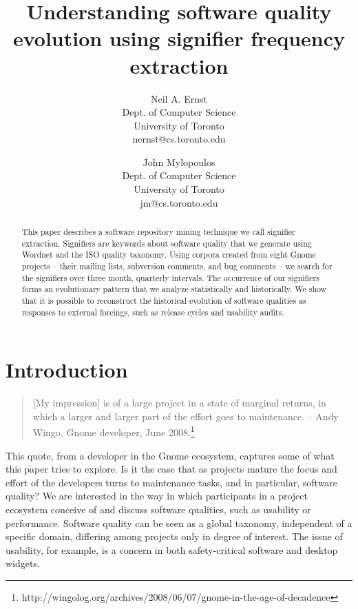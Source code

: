 \documentclass[conference, compsoc]{IEEEtran}
\begin{document}

 
\title{Understanding software quality evolution using signifier frequency extraction}
\author{
Neil A. Ernst\\Dept. of Computer Science\\University of Toronto\\nernst@cs.toronto.edu \and
John Mylopoulos\\Dept. of Computer Science\\University of Toronto\\jm@cs.toronto.edu }

\maketitle

\begin{abstract}
This paper describes a software repository mining technique we call signifier extraction. Signifiers are keywords about software quality that we generate using Wordnet and the ISO quality taxonomy. Using corpora created from eight Gnome projects -- their mailing lists, subversion comments, and bug comments -- we search for the signifiers over three month, quarterly intervals. The occurrence of our signifiers forms an evolutionary pattern that we analyze statistically and historically. We show that it is possible to reconstruct the historical evolution of software qualities as responses to external forcings, such as release cycles and usability audits. %
\end{abstract}
\vspace{-2mm}
\section{Introduction}\label{sect:introduction}%
\vspace{-2mm}
\begin{quote}[My impression] is of a large project in a state of marginal returns, in which a larger and larger part of the effort goes to maintenance. -- Andy Wingo, Gnome developer, June 2008.\footnote{http://wingolog.org/archives/2008/06/07/gnome-in-the-age-of-decadence}\end{quote}
	This quote, from a developer in the Gnome ecosystem, captures some of what this paper tries to explore. Is it the case that as projects mature the focus and effort of the developers turns to maintenance tasks, and in particular, software quality? %
We are interested in the way in which participants in a project ecosystem conceive of and discuss software qualities, such as usability or performance. Software quality can be seen as a global taxonomy, independent of a specific domain, differing among projects only in degree of interest. The issue of usability, for example, is a concern in both safety-critical software and desktop widgets. 
\end{document}
